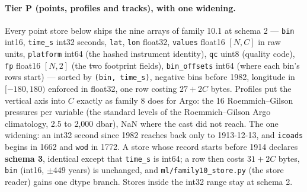 \documentclass[10pt]{article}
\newcommand{\code}[1]{\texttt{#1}}
\begin{document}
\paragraph{Tier P (points, profiles and tracks), with one widening.} Every point store below ships the nine arrays of
family 10.1 at schema 2 --- \code{bin} int16, \code{time\_s} int32 seconds,
\code{lat}, \code{lon} float32, \code{values} float16 $[N, C]$ in raw units,
\code{platform} int64 (the hashed instrument identity), \code{qc} uint8 (quality code), \code{fp} float16 $[N, 2]$ (the two footprint fields),
\code{bin\_offsets} int64 (where each bin's rows start) --- sorted by \code{(bin, time\_s)}, negative bins
before 1982, longitude in $[-180, 180)$ enforced in float32, one row costing
$27 + 2C$ bytes. Profiles put the vertical axis into $C$ exactly as family 8
does for Argo: the 16 Roemmich--Gilson pressures per variable (the standard
levels of the Roemmich--Gilson Argo climatology, 2.5 to 2,000 dbar), NaN
where the cast did not reach. The one widening: an int32 second since 1982
reaches back only to 1913-12-13, and \code{icoads} begins in 1662 and
\code{wod} in 1772. A store whose record starts before 1914 declares
\textbf{schema 3}, identical except that \code{time\_s} is int64; a row then
costs $31 + 2C$ bytes, \code{bin} (int16, $\pm 449$ years) is unchanged, and
\code{ml/family10\_store.py} (the store reader) gains one dtype branch. Stores inside the int32
range stay at schema 2.
\end{document}

